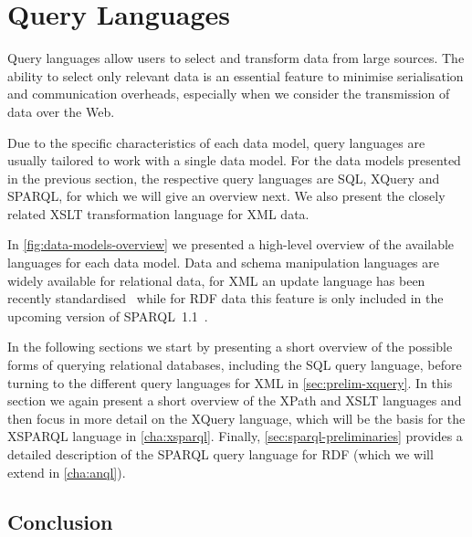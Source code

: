 \chapter{Query Languages}
\label{cha:query-languages}

Query languages allow users to select and transform data from large sources.  The ability to select only relevant data
is an essential feature to minimise serialisation and communication overheads, especially when we consider the
transmission of data over the Web.
%

Due to the specific characteristics of each data model, query languages are usually tailored to work with a single data
model.
%
For the data models presented in the previous section, the respective query languages are \acs{SQL}, XQuery and SPARQL,
for which we will give an overview next.
%
We also present the closely related \acs{XSLT} transformation language for \ac{XML} data.
%

In \cref{fig:data-models-overview} we presented a high-level overview of the available languages for each data model.
Data and schema manipulation languages are widely available for relational data, for \ac{XML} an update language has
been recently standardised~\cite{RobieChamberlinDyck:2011aa} while for \ac{RDF} data this feature is only included in
the upcoming version of SPARQL~1.1~\cite{GearonPassantPolleres:2012aa}.

In the following sections we start by presenting a short overview of the possible forms of querying relational
databases, including the \ac{SQL} query language, before turning to the different query languages for \ac{XML} in
\cref{sec:prelim-xquery}.  In this section we again present a short overview of the XPath and \ac{XSLT} languages and
then focus in more detail on the XQuery language, which will be the basis for the XSPARQL language in
\cref{cha:xsparql}.
%
Finally, \cref{sec:sparql-preliminaries} provides a detailed description of the SPARQL query language for
\ac{RDF} (which we will extend in \cref{cha:anql}).










\section{Conclusion}
\label{sec:conclusion-query-languages}


